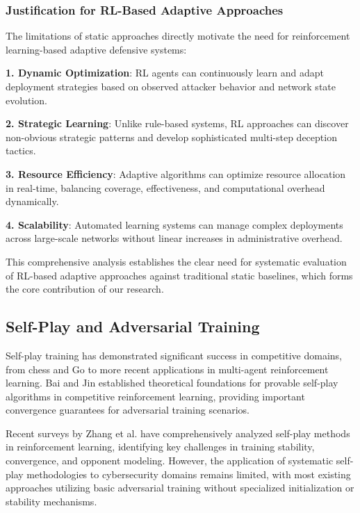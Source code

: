 \documentclass[12pt,oneside,a4paper]{article}
\theoremstyle{definition}
\theoremstyle{plain}
\begin{document}
\subsubsection{Justification for RL-Based Adaptive Approaches}

The limitations of static approaches directly motivate the need for reinforcement learning-based adaptive defensive systems:

\textbf{1. Dynamic Optimization}: RL agents can continuously learn and adapt deployment strategies based on observed attacker behavior and network state evolution.

\textbf{2. Strategic Learning}: Unlike rule-based systems, RL approaches can discover non-obvious strategic patterns and develop sophisticated multi-step deception tactics.

\textbf{3. Resource Efficiency}: Adaptive algorithms can optimize resource allocation in real-time, balancing coverage, effectiveness, and computational overhead dynamically.

\textbf{4. Scalability}: Automated learning systems can manage complex deployments across large-scale networks without linear increases in administrative overhead.

This comprehensive analysis establishes the clear need for systematic evaluation of RL-based adaptive approaches against traditional static baselines, which forms the core contribution of our research.

\subsection{Self-Play and Adversarial Training}

Self-play training has demonstrated significant success in competitive domains, from chess and Go to more recent applications in multi-agent reinforcement learning. Bai and Jin \cite{bai2020provable} established theoretical foundations for provable self-play algorithms in competitive reinforcement learning, providing important convergence guarantees for adversarial training scenarios.

Recent surveys by Zhang et al. \cite{zhang2024survey} have comprehensively analyzed self-play methods in reinforcement learning, identifying key challenges in training stability, convergence, and opponent modeling. However, the application of systematic self-play methodologies to cybersecurity domains remains limited, with most existing approaches utilizing basic adversarial training without specialized initialization or stability mechanisms.
\end{document}
